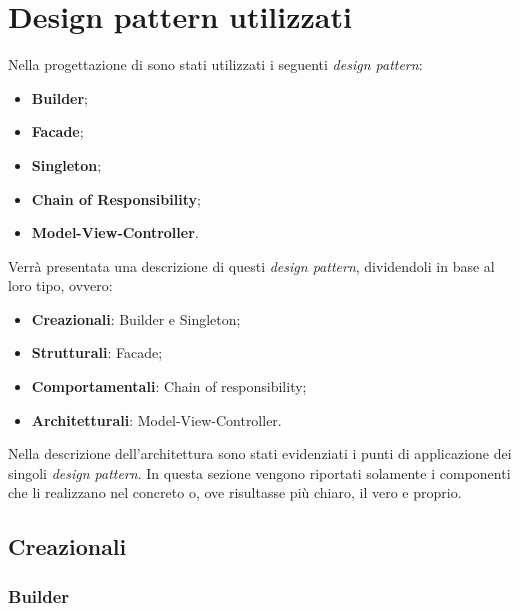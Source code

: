 \newpage
\section{Design pattern utilizzati}
Nella progettazione di  sono stati utilizzati i seguenti \textit{design pattern}:
\begin{itemize}
\item \textbf{Builder};
\item \textbf{Facade};
\item \textbf{Singleton};
\item \textbf{Chain of Responsibility};
\item \textbf{Model-View-Controller}.
\end{itemize}
Verrà presentata una descrizione di questi \textit{design pattern}, dividendoli in base al loro tipo, ovvero:
\begin{itemize}
\item \textbf{Creazionali}: Builder e Singleton;
\item \textbf{Strutturali}: Facade;
\item \textbf{Comportamentali}: Chain of responsibility;
\item \textbf{Architetturali}: Model-View-Controller.
\end{itemize}
Nella descrizione dell'architettura sono stati evidenziati i punti di applicazione dei singoli \textit{design pattern}. In questa sezione vengono riportati solamente i componenti che li realizzano nel concreto o, ove risultasse più chiaro, il  vero e proprio.
\subsection{Creazionali}
\subsubsection{Builder}

